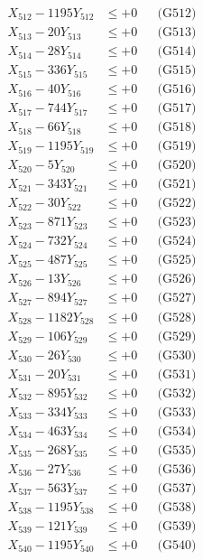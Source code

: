 \documentclass[a4paper,10pt]{article}
\begin{document}
{\begin{align}
X_{512} - 1195Y_{512} &\leq +0 && \text{(G512)} \\
X_{513} - 20Y_{513} &\leq +0 && \text{(G513)} \\
X_{514} - 28Y_{514} &\leq +0 && \text{(G514)} \\
X_{515} - 336Y_{515} &\leq +0 && \text{(G515)} \\
X_{516} - 40Y_{516} &\leq +0 && \text{(G516)} \\
X_{517} - 744Y_{517} &\leq +0 && \text{(G517)} \\
X_{518} - 66Y_{518} &\leq +0 && \text{(G518)} \\
X_{519} - 1195Y_{519} &\leq +0 && \text{(G519)} \\
X_{520} - 5Y_{520} &\leq +0 && \text{(G520)} \\
\allowbreak
X_{521} - 343Y_{521} &\leq +0 && \text{(G521)} \\
X_{522} - 30Y_{522} &\leq +0 && \text{(G522)} \\
X_{523} - 871Y_{523} &\leq +0 && \text{(G523)} \\
X_{524} - 732Y_{524} &\leq +0 && \text{(G524)} \\
X_{525} - 487Y_{525} &\leq +0 && \text{(G525)} \\
X_{526} - 13Y_{526} &\leq +0 && \text{(G526)} \\
X_{527} - 894Y_{527} &\leq +0 && \text{(G527)} \\
X_{528} - 1182Y_{528} &\leq +0 && \text{(G528)} \\
X_{529} - 106Y_{529} &\leq +0 && \text{(G529)} \\
X_{530} - 26Y_{530} &\leq +0 && \text{(G530)} \\
\allowbreak
X_{531} - 20Y_{531} &\leq +0 && \text{(G531)} \\
X_{532} - 895Y_{532} &\leq +0 && \text{(G532)} \\
X_{533} - 334Y_{533} &\leq +0 && \text{(G533)} \\
X_{534} - 463Y_{534} &\leq +0 && \text{(G534)} \\
X_{535} - 268Y_{535} &\leq +0 && \text{(G535)} \\
X_{536} - 27Y_{536} &\leq +0 && \text{(G536)} \\
X_{537} - 563Y_{537} &\leq +0 && \text{(G537)} \\
X_{538} - 1195Y_{538} &\leq +0 && \text{(G538)} \\
X_{539} - 121Y_{539} &\leq +0 && \text{(G539)} \\
X_{540} - 1195Y_{540} &\leq +0 && \text{(G540)} \\

\end{align}}
\end{document}
